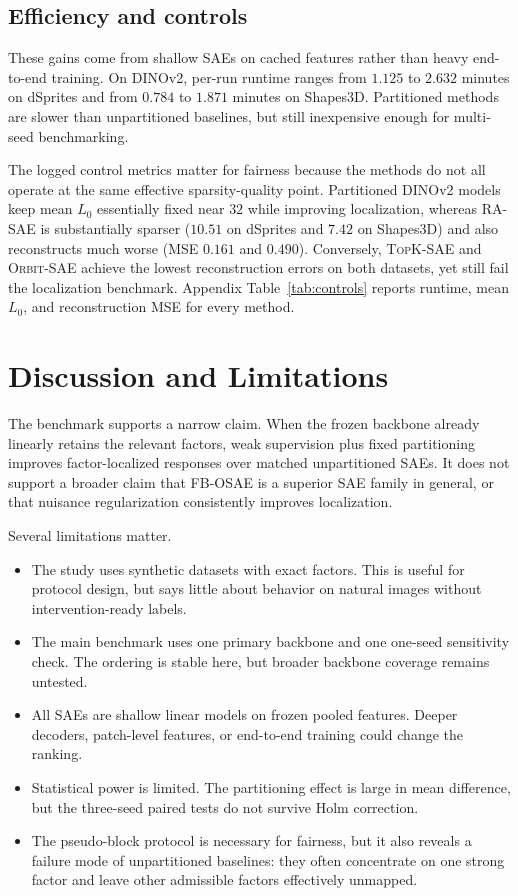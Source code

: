\documentclass[10pt,twocolumn]{article}
\newcommand{\method}[1]{\textsc{#1}}
\begin{document}
\subsection{Efficiency and controls}
These gains come from shallow SAEs on cached features rather than heavy end-to-end training. On DINOv2, per-run runtime ranges from $1.125$ to $2.632$ minutes on dSprites and from $0.784$ to $1.871$ minutes on Shapes3D. Partitioned methods are slower than unpartitioned baselines, but still inexpensive enough for multi-seed benchmarking.

The logged control metrics matter for fairness because the methods do not all operate at the same effective sparsity-quality point. Partitioned DINOv2 models keep mean $L_0$ essentially fixed near $32$ while improving localization, whereas RA-SAE is substantially sparser ($10.51$ on dSprites and $7.42$ on Shapes3D) and also reconstructs much worse (MSE $0.161$ and $0.490$). Conversely, \method{TopK-SAE} and \method{Orbit-SAE} achieve the lowest reconstruction errors on both datasets, yet still fail the localization benchmark. Appendix Table~\ref{tab:controls} reports runtime, mean $L_0$, and reconstruction MSE for every method.

\section{Discussion and Limitations}
\label{sec:discussion}
The benchmark supports a narrow claim. When the frozen backbone already linearly retains the relevant factors, weak supervision plus fixed partitioning improves factor-localized responses over matched unpartitioned SAEs. It does not support a broader claim that \method{FB-OSAE} is a superior SAE family in general, or that nuisance regularization consistently improves localization.

Several limitations matter.
\begin{itemize}
  \item The study uses synthetic datasets with exact factors. This is useful for protocol design, but says little about behavior on natural images without intervention-ready labels.
  \item The main benchmark uses one primary backbone and one one-seed sensitivity check. The ordering is stable here, but broader backbone coverage remains untested.
  \item All SAEs are shallow linear models on frozen pooled features. Deeper decoders, patch-level features, or end-to-end training could change the ranking.
  \item Statistical power is limited. The partitioning effect is large in mean difference, but the three-seed paired tests do not survive Holm correction.
  \item The pseudo-block protocol is necessary for fairness, but it also reveals a failure mode of unpartitioned baselines: they often concentrate on one strong factor and leave other admissible factors effectively unmapped.
\end{itemize}
\end{document}
